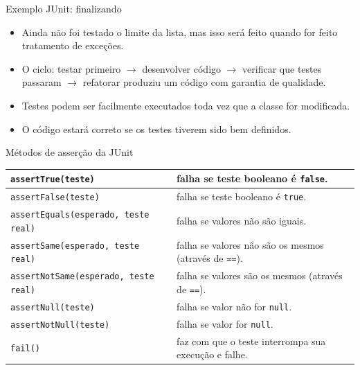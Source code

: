 \documentclass[handout]{beamer}
\begin{document}
\begin{frame}{Exemplo JUnit: finalizando}
\begin{itemize}
\item Ainda não foi testado o limite da lista, mas isso será feito quando for feito tratamento de exceções.
\item O ciclo: testar primeiro $\longrightarrow$ desenvolver código $\longrightarrow$ verificar que testes passaram $\longrightarrow$ refatorar produziu um código com garantia de qualidade.
\item Testes podem ser facilmente executados toda vez que a classe for modificada.
\item O código estará correto se os testes tiverem sido bem definidos.
\end{itemize}
\end{frame}

\begin{frame}[fragile]{Métodos de asserção da JUnit}

\begin{center}
\begin{tabular}{|l|p{5cm}|}
\hline
\lstinline|assertTrue(teste)| & \footnotesize falha se teste booleano é \lstinline|false|.\\ \hline
\lstinline|assertFalse(teste)| & \footnotesize falha se teste booleano é \lstinline|true|.\\ \hline
\lstinline|assertEquals(esperado, teste real)| & \footnotesize falha se valores não são iguais.\\ \hline
\lstinline|assertSame(esperado, teste real)| & \footnotesize falha se valores não são os mesmos (através de \lstinline|==|).\\ \hline
\lstinline|assertNotSame(esperado, teste real)| & \footnotesize falha se valores são os mesmos (através de \lstinline|==|).\\ \hline
\lstinline|assertNull(teste)| & \footnotesize falha se valor não for \lstinline|null|.\\ \hline
\lstinline|assertNotNull(teste)| & \footnotesize falha se valor for \lstinline|null|.\\ \hline
\lstinline|fail()| & \footnotesize faz com que o teste interrompa sua execução e falhe.\\ \hline
\end{tabular}
\end{center}


\end{frame}
\end{document}
